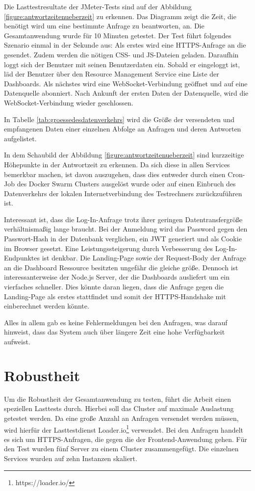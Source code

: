 Die Lasttestresultate der JMeter-Tests sind auf der Abbildung \ref{figure:antwortzeitenueberzeit}
zu erkennen. Das Diagramm zeigt die Zeit, die benötigt wird um eine bestimmte Anfrage zu beantworten, an.
Die Gesamtanwendung wurde für 10 Minuten getestet.
Der Test führt folgendes Szenario einmal in der Sekunde aus:
Als erstes wird eine HTTPS-Anfrage an die  gesendet.
Zudem werden die nötigen CSS- und JS-Dateien geladen.
Daraufhin loggt sich der Benutzer mit seinen Benutzerdaten ein.
Sobald er eingeloggt ist, läd der Benutzer über den Resource Management Service
eine Liste der \foreignlanguage{english}{Dashboards}. Als nächstes wird eine WebSocket-Verbindung geöffnet
und auf eine Datenquelle abonniert. Nach Ankunft der ersten Daten der
Datenquelle, wird die WebSocket-Verbindung wieder geschlossen.

In Tabelle \ref{tab:groessedesdatenverkehrs} wird die Größe der versendeten und empfangenen 
Daten einer einzelnen Abfolge an Anfragen und deren Antworten aufgelistet.

In dem Schaubild der Abbildung \ref{figure:antwortzeitenueberzeit}
sind kurzzeitige Höhepunkte in der Antwortzeit zu erkennen. Da sich diese
in allen Services bemerkbar machen, ist davon auszugehen, dass dies
entweder durch einen Cron-Job des Docker Swarm Clusters ausgelöst wurde oder auf einen
Einbruch des Datenverkehrs der lokalen Internetverbindung des Testrechners zurückzuführen
ist.

Interessant ist, dass die Log-In-Anfrage trotz ihrer geringen Datentransfergröße verhältnismaßig
lange braucht. Bei der Anmeldung wird das Password gegen den Passwort-Hash in der Datenbank verglichen,
ein JWT generiert und als Cookie im Browser gesetzt. Eine Leistungssteigerung durch Verbesserung
des Log-In-Endpunktes ist denkbar. Die Landing-Page  sowie der Request-Body der
Anfrage an die Dashboard Ressource besitzten ungefähr die gleiche größe. Dennoch ist interessanterweise
der Node.js Server, der die \foreignlanguage{english}{Dashboards} ausliefert um ein vierfaches schneller. Dies könnte daran liegen,
dass die Anfrage gegen die Landing-Page als erstes stattfindet und somit der HTTPS-Handshake
mit einberechnet werden könnte.

Alles in allem gab es keine Fehlermeldungen bei den Anfragen, was darauf hinweist, dass das System
auch über längere Zeit eine hohe Verfügbarkeit aufweist.

\section{Robustheit}
\label{sec:robustheit}
Um die Robustheit der Gesamtanwendung zu testen, führt die Arbeit
einen speziellen Lasttests durch. Hierbei soll das Cluster auf maximale
Auslastung getestet werden. Da eine große Anzahl an Anfragen versendet werden müssen,
wird hierfür der Lasttestdienst Loader.io\footnote{https://loader.io/} verwendet.
Bei den Anfragen handelt es sich um HTTPS-Anfragen, die gegen
die  der Frontend-Anwendung gehen. Für den Test
wurden fünf Server zu einem Cluster zusammengefügt. Die einzelnen Services wurden
auf zehn Instanzen skaliert.

